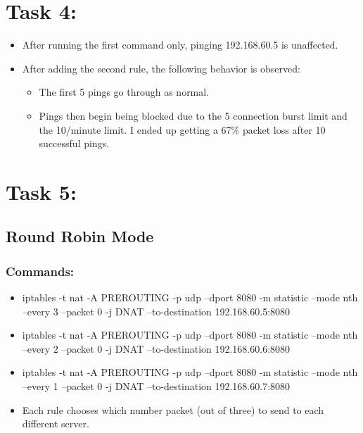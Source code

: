 \documentclass[11pt]{article}
\begin{document}
\section*{Task 4:}
\label{sec:org1442e4a}
\begin{itemize}
\item After running the first command only, pinging 192.168.60.5 is unaffected.
\item After adding the second rule, the following behavior is observed:
\begin{itemize}
\item The first 5 pings go through as normal.
\item Pings then begin being blocked due to the 5 connection burst limit and the 10/minute limit. I ended up getting a 67\% packet loss after 10 successful pings.
\end{itemize}
\end{itemize}
\section*{Task 5:}
\label{sec:org9091d47}
\subsection*{Round Robin Mode}
\label{sec:orga032260}
\subsubsection*{Commands:}
\label{sec:orga2de8c5}
\begin{itemize}
\item iptables -t nat -A PREROUTING -p udp --dport 8080 -m statistic --mode nth --every 3 --packet 0 -j DNAT --to-destination 192.168.60.5:8080
\item iptables -t nat -A PREROUTING -p udp --dport 8080 -m statistic --mode nth --every 2 --packet 0 -j DNAT --to-destination 192.168.60.6:8080
\item iptables -t nat -A PREROUTING -p udp --dport 8080 -m statistic --mode nth --every 1 --packet 0 -j DNAT --to-destination 192.168.60.7:8080
\item Each rule chooses which number packet (out of three) to send to each different server.
\end{itemize}
\end{document}
